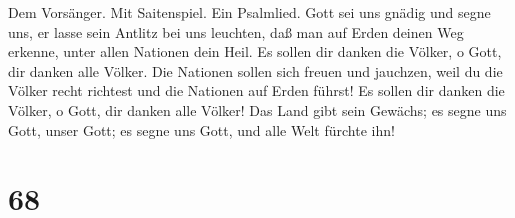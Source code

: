 Dem Vorsänger. Mit Saitenspiel. Ein Psalmlied. Gott sei
uns gnädig und segne uns, er lasse sein Antlitz bei uns leuchten,
 daß man auf Erden deinen Weg erkenne, unter allen
Nationen dein Heil.  Es sollen dir danken die Völker, o
Gott, dir danken alle Völker.  Die Nationen sollen sich
freuen und jauchzen, weil du die Völker recht richtest und die Nationen
auf Erden führst!  Es sollen dir danken die Völker, o
Gott, dir danken alle Völker!  Das Land gibt sein Gewächs;
es segne uns Gott, unser Gott;  es segne uns Gott, und
alle Welt fürchte ihn!

\hypertarget{section-67}{%
\section{68}\label{section-67}}

